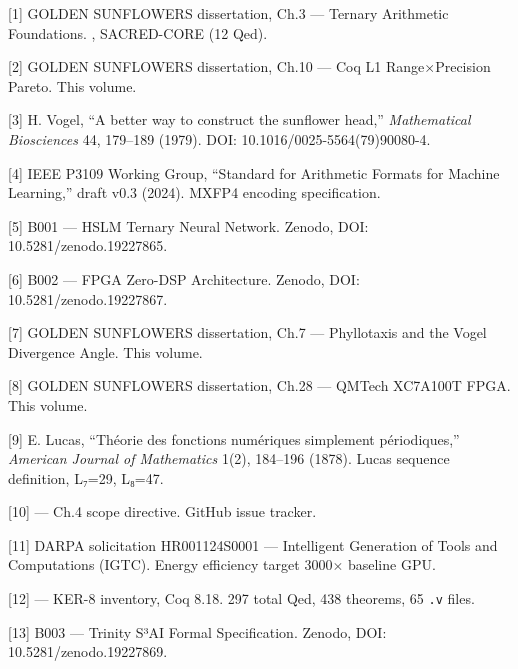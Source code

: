 [1] GOLDEN SUNFLOWERS dissertation, Ch.3 ---
Ternary Arithmetic Foundations.
,
SACRED-CORE (12 Qed).

[2] GOLDEN SUNFLOWERS dissertation, Ch.10 ---
Coq L1 Range$\times$Precision Pareto. This volume.

[3] H. Vogel, ``A better way to construct the
sunflower head,'' \emph{Mathematical Biosciences}
44, 179--189 (1979). DOI:
10.1016/0025-5564(79)90080-4.

[4] IEEE P3109 Working Group, ``Standard for
Arithmetic Formats for Machine Learning,'' draft
v0.3 (2024). MXFP4 encoding specification.

[5] B001 --- HSLM Ternary Neural Network.
Zenodo, DOI: 10.5281/zenodo.19227865.

[6] B002 --- FPGA Zero-DSP Architecture.
Zenodo, DOI: 10.5281/zenodo.19227867.

[7] GOLDEN SUNFLOWERS dissertation, Ch.7 ---
Phyllotaxis and the Vogel Divergence Angle. This
volume.

[8] GOLDEN SUNFLOWERS dissertation, Ch.28 ---
QMTech XC7A100T FPGA. This volume.

[9] E. Lucas, ``Théorie des fonctions
numériques simplement périodiques,''
\emph{American Journal of Mathematics} 1(2),
184--196 (1878). Lucas sequence definition, L₇=29,
L₈=47.

[10]  --- Ch.4
scope directive. GitHub issue tracker.

[11] DARPA solicitation HR001124S0001 ---
Intelligent Generation of Tools and Computations
(IGTC). Energy efficiency target 3000$\times$ baseline
GPU.

[12]
--- KER-8 inventory, Coq 8.18. 297 total Qed, 438
theorems, 65 \texttt{.v} files.

[13] B003 --- Trinity S³AI Formal
Specification. Zenodo, DOI:
10.5281/zenodo.19227869.


